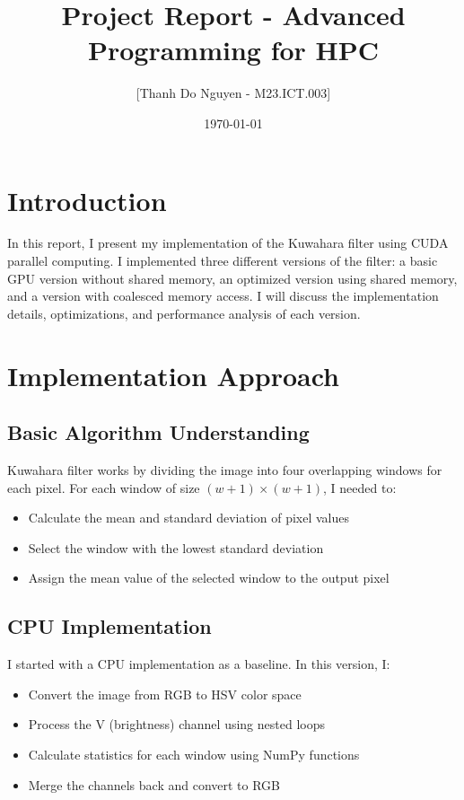 \documentclass[12pt]{article}
\title{Project Report - Advanced Programming for HPC}
\author{[Thanh Do Nguyen - M23.ICT.003]}
\date{\today}
\begin{document}
\maketitle

\section{Introduction}
In this report, I present my implementation of the Kuwahara filter using CUDA parallel computing. I implemented three different versions of the filter: a basic GPU version without shared memory, an optimized version using shared memory, and a version with coalesced memory access. I will discuss the implementation details, optimizations, and performance analysis of each version.

\section{Implementation Approach}

\subsection{Basic Algorithm Understanding}
Kuwahara filter works by dividing the image into four overlapping windows for each pixel. For each window of size \((w + 1) × (w + 1)\), I needed to:
\begin{itemize}
    \item Calculate the mean and standard deviation of pixel values
    \item Select the window with the lowest standard deviation
    \item Assign the mean value of the selected window to the output pixel
\end{itemize}

\subsection{CPU Implementation}
I started with a CPU implementation as a baseline. In this version, I:
\begin{itemize}
    \item Convert the image from RGB to HSV color space
    \item Process the V (brightness) channel using nested loops
    \item Calculate statistics for each window using NumPy functions
    \item Merge the channels back and convert to RGB
\end{itemize}
\end{document}

